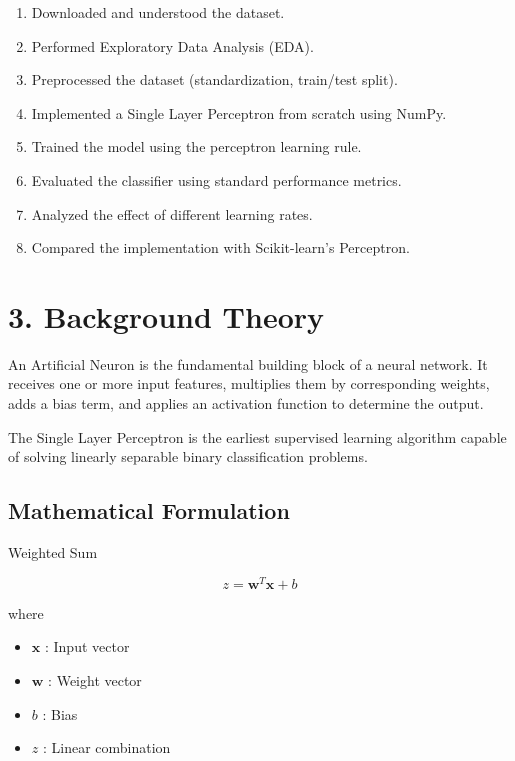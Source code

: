 \documentclass[11pt]{article}
\begin{document}
\begin{enumerate}[leftmargin=*]
\item Downloaded and understood the dataset.
\item Performed Exploratory Data Analysis (EDA).
\item Preprocessed the dataset (standardization, train/test split).
\item Implemented a Single Layer Perceptron from scratch using NumPy.
\item Trained the model using the perceptron learning rule.
\item Evaluated the classifier using standard performance metrics.
\item Analyzed the effect of different learning rates.
\item Compared the implementation with Scikit-learn's Perceptron.
\end{enumerate}


\section*{3. Background Theory}

An Artificial Neuron is the fundamental building block of a neural network. It receives one or more input features, multiplies them by corresponding weights, adds a bias term, and applies an activation function to determine the output.

The Single Layer Perceptron is the earliest supervised learning algorithm capable of solving linearly separable binary classification problems.

\subsection*{Mathematical Formulation}

Weighted Sum

\[
z=\mathbf{w}^{T}\mathbf{x}+b
\]

where

\begin{itemize}
\item $\mathbf{x}$ : Input vector
\item $\mathbf{w}$ : Weight vector
\item $b$ : Bias
\item $z$ : Linear combination
\end{itemize}
\end{document}
